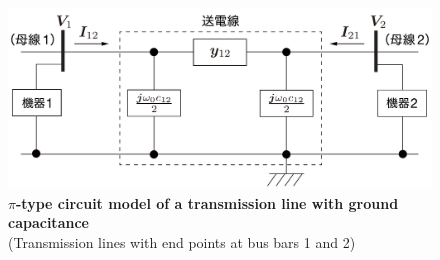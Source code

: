 \documentclass[graybox, envcountchap]{svmult}
\begin{document}
\begin{figure}[t]
  \centering
  \includegraphics[width = .85\linewidth]{figs/line_pix3}
  \medskip
  \caption{\textbf{$\pi$-type circuit model of a transmission line with ground capacitance}\\
  \centering(Transmission lines with end points at bus bars 1 and 2)}
  \label{fig:lines} 
  \medskip
\end{figure}
\end{document}
